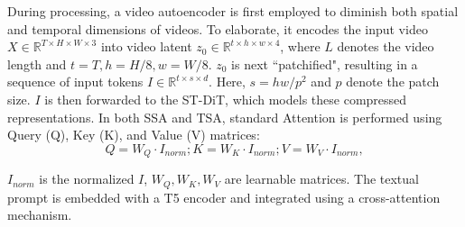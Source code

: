During processing, a video autoencoder \cite{yu2023magvit} is first employed to diminish both spatial and temporal dimensions of videos. To elaborate, it encodes the input video $X \in \mathbb{R}^{T \times H \times W \times 3}$ into video latent $z_{0} \in \mathbb{R}^{t \times h \times w \times 4}$, where $L$ denotes the video length and $t = T, h = H / 8, w = W / 8$.  $z_{0}$ is next ``patchified", resulting in a sequence of input tokens $I \in \mathbb{R}^{t \times s \times d} $. Here, $s = hw/p^2$ and $p$ denote the patch size. 
$I$ is then forwarded to the ST-DiT, which models these compressed representations. 
In both SSA and TSA, standard Attention is performed using Query (Q), Key (K), and Value (V) matrices:
\[
Q = W_{Q} \cdot I_{norm}; K = W_{K} \cdot I_{norm}; V = W_{V} \cdot I_{norm},
\]

$I_{norm}$ is the normalized $I$, $W_{Q},W_{K}, W_{V}$ are learnable matrices.
The textual prompt is embedded with a T5 encoder and integrated using a cross-attention mechanism.

    

